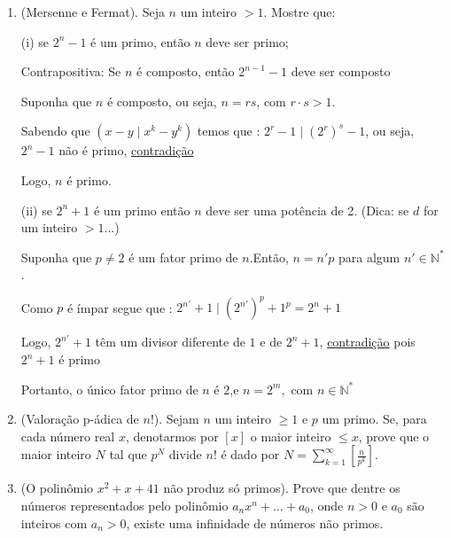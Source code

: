 \begin{enumerate}[label=4.\arabic*.]
    \item (Mersenne e Fermat). Seja $n$ um inteiro $>1$. Mostre que: 
    
    (i) se $2^n - 1$ é um primo, então $n$ deve ser primo; 
    
    Contrapositiva: Se $n$ é composto, então $2^{n-1} - 1$ deve ser composto
    
    Suponha que $n$ é composto, ou seja, $n = rs$, com $r \cdot s > 1$.
    
    Sabendo que $(x-y \mid x^k - y^k)$ temos que : $2^r - 1 \mid (2^r)^s - 1$, ou seja, $2^n - 1$ não é primo,
    \underline{contradição}

    Logo, $n$ é primo.

    (ii) se $2^n + 1$ é um primo então $n$ deve ser uma potência de 2. (Dica: se $d$ for um inteiro $>1$...)
    
    Suponha que $p \neq 2$ é um fator primo de $n$.Então, $n = n'p$ para algum $n' \in \mathbb{N}^*$.
    
    Como $p$ é ímpar segue que : $2^{n'} + 1 \mid (2^{n'})^p + 1^p = 2^n + 1$
    
    Logo, $2^{n'} + 1$ têm um divisor diferente de $1$ e de $2^n + 1$, \underline{contradição} pois $2^n + 1$ é primo

    Portanto, o único fator primo de $n$ é $2$,e $n = 2^m,\text{ com } n \in \mathbb{N}^*$
        
    \item (Valoração p-ádica de $n!$). Sejam $n$ um inteiro $\geq 1$ e $p$ um primo. Se, para cada número real $x$, denotarmos por $[x]$ o maior inteiro $\leq x$, prove que o maior inteiro $N$ tal que $p^N$ divide $n!$ é dado por $N = \sum_{k=1}^{\infty} \left[ \frac{n}{p^k} \right]$.
    
    \item (O polinômio $x^2 + x + 41$ não produz só primos). Prove que dentre os números representados pelo polinômio $a_n x^n + \ldots + a_0$, onde $n > 0$ e $a_0$ são inteiros com $a_n > 0$, existe uma infinidade de números não primos.

\end{enumerate}
